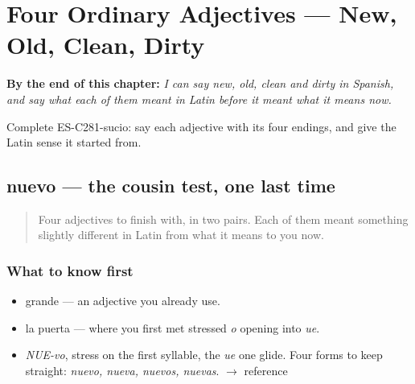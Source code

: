 
\chapter{Four Ordinary Adjectives --- New, Old, Clean, Dirty}
\label{ch:cuatro-adjetivos}

\begin{chapteropening}
\textbf{By the end of this chapter:} \emph{I can say new, old, clean and dirty in Spanish, and say what each of them meant in Latin before it meant what it means now.}

Complete ES-C281-sucio: say each adjective with its four endings, and give the Latin sense it started from.
\end{chapteropening}

\section[nuevo]{nuevo — the cousin test, one last time}

\label{lesson:ES-C281-nuevo}



\begin{quote}
Four adjectives to finish with, in two pairs. Each of them meant something slightly different in Latin from what it means to you now.
\end{quote}

\subsection*{What to know first}
\begin{itemize}
\raggedright
  \item grande — an adjective you already use.
  \item la puerta — where you first met stressed \emph{o} opening into \emph{ue}.
\end{itemize}

\begin{sounds}
\begin{itemize}
\raggedright
  \item \emph{NUE-vo}, stress on the first syllable, the \emph{ue} one glide. Four forms to keep straight: \emph{nuevo, nueva, nuevos, nuevas}. $\to$ reference
\end{itemize}
\end{sounds}

